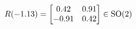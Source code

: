 \documentclass[preview]{standalone}
\begin{document}
\begin{align*}
\special{dvisvgm:raw <g id='unique000'>}R(-1.13) = \begin{bmatrix} 0.42 & 0.91 \\ -0.91 & 0.42 \end{bmatrix} \in \text{SO}(2)\special{dvisvgm:raw </g>}
\end{align*}
\end{document}
